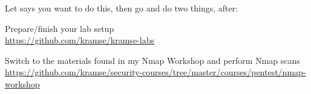 \documentclass[Screen16to9,17pt]{foils}
\begin{document}

\begin{list2}
\item Let says you want to do this, then go and do two things, after:
\item Prepare/finish your lab setup\\
\url{https://github.com/kramse/kramse-labs}

\item Switch to the materials found in my Nmap Workshop and perform Nmap scans\\
\url{https://github.com/kramse/security-courses/tree/master/courses/pentest/nmap-workshop}
\end{list2}
\end{document}
